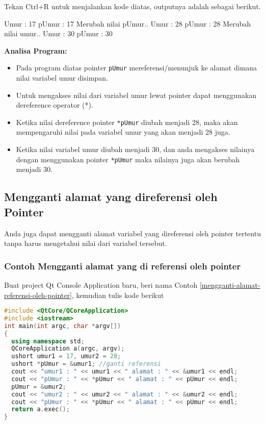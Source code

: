 Tekan Ctrl+R untuk menjalankan kode diatas, outputnya adalah sebagai
berikut.

\begin{lcverbatim}
Umur : 17
pUmur : 17
Merubah nilai pUmur..
Umur : 28
pUmur : 28
Merubah nilai umur..
Umur : 30
pUmur : 30
\end{lcverbatim}

\textbf{Analisa Program:}

\begin{itemize}
\tightlist
\item
  Pada program diatas pointer \texttt{pUmur} mereferensi/menunjuk ke
  alamat dimana nilai variabel umur disimpan.
\item
  Untuk mengakses nilai dari variabel umur lewat pointer dapat
  menggunakan dereference operator (*).
\item
  Ketika nilai dereference pointer \texttt{*pUmur} diubah menjadi 28,
  maka akan mempengaruhi nilai pada variabel umur yang akan menjadi 28
  juga.
\item
  Ketika nilai variabel umur diubah menjadi 30, dan anda mengakses
  nilainya dengan menggunakan pointer \texttt{*pUmur} maka nilainya juga
  akan berubah menjadi 30.
\end{itemize}

\subsection{Mengganti alamat yang direferensi oleh
Pointer}\label{mengganti-alamat-yang-direferensi-oleh-pointer}

Anda juga dapat mengganti alamat variabel yang direferensi oleh pointer
tertentu tanpa harus mengetahui nilai dari variabel tersebut.

\subsubsection*{Contoh  Mengganti alamat yang di referensi oleh pointer}

Buat project Qt Console Application baru, beri nama Contoh \ref{mengganti-alamat-referensi-oleh-pointer}, kemudian
tulis kode berikut

\begin{lstlisting}[language=c++, caption=Mengganti alamat yang di referensi oleh pointer, label=mengganti-alamat-referensi-oleh-pointer]
#include <QtCore/QCoreApplication>
#include <iostream>
int main(int argc, char *argv[])
{
  using namespace std;
  QCoreApplication a(argc, argv);
  ushort umur1 = 17, umur2 = 28;
  ushort *pUmur = &umur1; //ganti referensi
  cout << "umur1 : " << umur1 << " alamat : " << &umur1 << endl;
  cout << "pUmur : " << *pUmur << " alamat : " << pUmur << endl;
  pUmur = &umur2;
  cout << "umur2 : " << umur2 << " alamat : " << &umur2 << endl;
  cout << "pUmur : " << *pUmur << " alamat : " << pUmur << endl;
  return a.exec();
}
\end{lstlisting}

